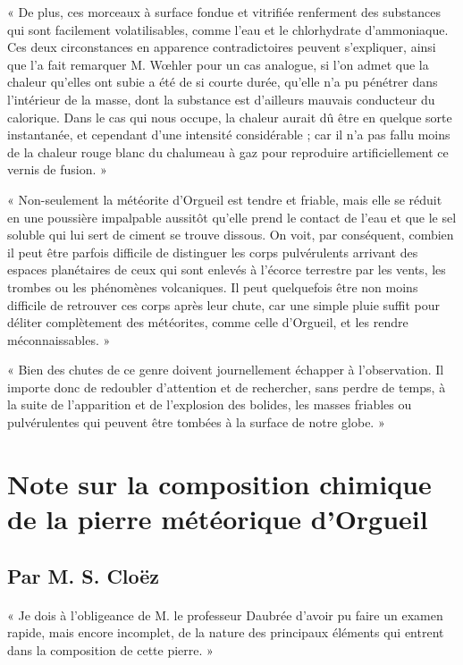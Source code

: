 \documentclass[a4paper, 11pt, oneside, polutonikogreek, french]{article}
\begin{document}
« De plus, ces morceaux à surface fondue et vitrifiée renferment des substances qui sont facilement volatilisables, comme l'eau et le chlorhydrate d'ammoniaque. Ces deux circonstances en apparence contradictoires peuvent s'expliquer, ainsi que l'a fait remarquer M. Wœhler pour un cas analogue, si l'on admet que la chaleur qu'elles ont subie a été de si courte durée, qu'elle n'a pu pénétrer dans l'intérieur de la masse, dont la substance est d'ailleurs mauvais conducteur du calorique. Dans le cas qui nous occupe, la chaleur aurait dû être en quelque sorte instantanée, et cependant d'une intensité considérable ; car il n'a pas fallu moins de la chaleur rouge blanc du chalumeau à gaz pour reproduire artificiellement ce vernis de fusion. »
 
« Non-seulement la météorite d'Orgueil est tendre et friable, mais elle se réduit en une poussière impalpable aussitôt qu'elle prend le contact de l'eau et que le sel soluble qui lui sert de ciment se trouve dissous. On voit, par conséquent, combien il peut être parfois difficile de distinguer les corps pulvérulents arrivant des espaces planétaires de ceux qui sont enlevés à l'écorce terrestre par les vents, les trombes ou les phénomènes volcaniques. Il peut quelquefois être non moins difficile de retrouver ces corps après leur chute, car une simple pluie suffit pour déliter complètement des météorites, comme celle d'Orgueil, et les rendre méconnaissables. »

« Bien des chutes de ce genre doivent journellement échapper à l'observation. Il importe donc de redoubler d'attention et de rechercher, sans perdre de temps, à la suite de l'apparition et de l'explosion des bolides, les masses friables ou pulvérulentes qui peuvent être tombées à la surface de notre globe. »
\clearpage
\section{Note sur la composition chimique de la pierre météorique d'Orgueil}
\subsection*{Par M. S. Cloëz}
\paragraph{}
« Je dois à l'obligeance de M. le professeur Daubrée d'avoir pu faire un examen rapide, mais encore incomplet, de la nature des principaux éléments qui entrent dans la composition de cette pierre. »
\end{document}
